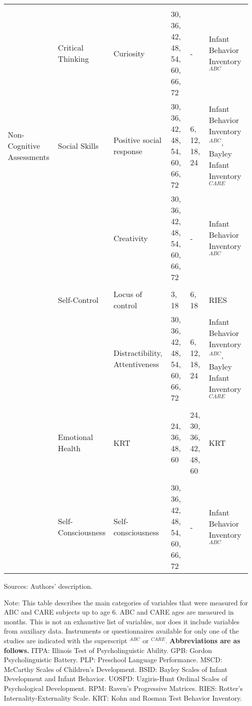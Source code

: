 \begin{sidewaystable}[H]
\begin{adjustbox}{max width=\textwidth, max height=\textheight,keepaspectratio}
\begin{threeparttable}
\begin{tabular}{L{3cm} C{3.5cm} C{4cm} C{1.5cm} C{1.5cm}  C{6cm}}
	& 	\\
	&	Critical Thinking	&	Curiosity	&	30, 36, 42, 48, 54, 60, 66, 72	& - &	Infant Behavior Inventory$^{ABC}$	\\ \midrule
Non-Cognitive Assessments	&	Social Skills	&	Positive social response	&	30, 36, 42, 48, 54, 60, 66, 72	&	6, 12, 18, 24		&	Infant Behavior Inventory$^{ABC}$, Bayley Infant Inventory$^{CARE}$	\\
	&		&	Creativity	&	30, 36, 42, 48, 54, 60, 66, 72	&	- 	&	Infant Behavior Inventory$^{ABC}$	\\
	&	\\
	&	Self-Control	&	Locus of control	&	3, 18	&	6, 18	& 	RIES	\\
	&		&	Distractibility, Attentiveness	&	30, 36, 42, 48, 54, 60, 66, 72	&	6, 12, 18, 24		&	Infant Behavior Inventory$^{ABC}$, Bayley Infant Inventory$^{CARE}$	\\
	&	\\
	&	Emotional Health	&	KRT	&	24, 36, 48, 60	&	24, 30, 36, 42, 48, 60	&	KRT	\\
	&	\\
	&	Self-Consciousness	&	Self-consciousness	&	30, 36, 42, 48, 54, 60, 66, 72	&	-	&	Infant Behavior Inventory$^{ABC}$	\\
\bottomrule
\end{tabular}
\begin{tablenotes}
\scriptsize
\item Sources: Authors' description. \\	
\item Note: This table describes the main categories of variables that were measured for ABC and CARE subjects up to age 6. ABC and CARE ages are measured in months. This is not an exhaustive list of variables, nor does it include variables from auxiliary data. Instruments or questionnaires available for only one of the studies are indicated with the superscript $^{ABC}$ or $^{CARE}$.  \textbf{Abbreviations are as follows.} ITPA: Illinois Test of Psycholinguistic Ability. GPB: Gordon Psycholinguistic Battery. PLP: Preschool Language Performance. MSCD: McCarthy Scales of Children's Development. BSID: Bayley Scales of Infant Development and Infant Behavior. UOSPD: Uzgiris-Hunt Ordinal Scales of Psychological Development. RPM: Raven's Progressive Matrices. RIES: Rotter's Internality-Externality Scale. KRT: Kohn and Rosman Test Behavior Inventory.
\end{tablenotes}
\end{threeparttable}
\end{adjustbox}
\end{sidewaystable}




